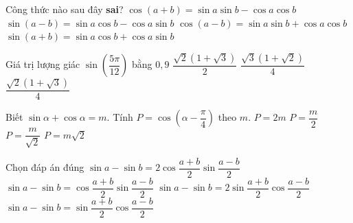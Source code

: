 \begin{ex}%
	Công thức nào sau đây {\bf sai}? 
	 \choice
		{\True $\cos  (a+b)=\sin a \sin b-\cos a \cos b$}
		{$\sin (a-b)=\sin a \cos b-\cos a \sin b$} 
		{$\cos (a-b)=\sin a \sin b+\cos a \cos b$} 
		{$\sin (a+b)=\sin a  \cos b+\cos a \sin b$}
\end{ex}

\begin{ex}%
	Giá trị lượng giác  $\sin \left(\dfrac{5\pi}{12}\right)$ bằng
	\choice 
		{$0{,}9$} 
		{$\dfrac{\sqrt{2} \left(1  + \sqrt{3}\right)}{2}$}
		{$\dfrac{\sqrt{3}  \left(1 + \sqrt{2}\right)}{4}$}
		{\True  $\dfrac{\sqrt{2} \left(1 + \sqrt{3}\right)}{4}$}
\end{ex}

\begin{ex}%
	Biết $\sin \alpha +\cos \alpha =m$. Tính $P=\cos \left(\alpha  -\dfrac{\pi}{4}\right)$ theo $m$.
	 \choice
		 {$P=2m$}
		{$P=\dfrac{m}{2}$} 
		{\True  $P=\dfrac{m}{\sqrt{2}}$}
		 {$P=m\sqrt{2}$}
\end{ex}

\begin{ex}%
	Chọn đáp án đúng 
	 \choice
		{\True $\sin a-\sin b=2 \cos \dfrac{a+b}{2} \sin \dfrac{a-b}{2}$} 
		{$\sin a-\sin b=\cos \dfrac{a+b}{2} \sin \dfrac{a-b}{2}$} 
		{$\sin a-\sin b=2  \sin \dfrac{a+b}{2} \cos \dfrac{a-b}{2}$}
		 {$\sin a-\sin b=\sin \dfrac{a+b}{2} \cos \dfrac{a-b}{2}$}
\end{ex}


